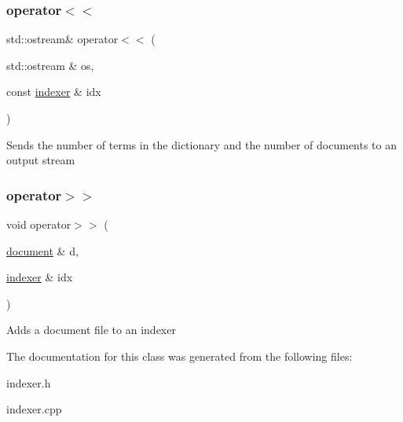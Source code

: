 \subsubsection{\texorpdfstring{operator$<$$<$}{operator<<}}
{\footnotesize\ttfamily std\+::ostream\& operator$<$$<$ (\begin{DoxyParamCaption}\item[{std\+::ostream \&}]{os,  }\item[{const \hyperlink{classindexer}{indexer} \&}]{idx }\end{DoxyParamCaption})\hspace{0.3cm}{\ttfamily [friend]}}

Sends the number of terms in the dictionary and the number of documents to an output stream \mbox{\label{classindexer_a0fe0af7a5ec91ffbe15a2a89d11fe038}} 
\subsubsection{\texorpdfstring{operator$>$$>$}{operator>>}}
{\footnotesize\ttfamily void operator$>$$>$ (\begin{DoxyParamCaption}\item[{\hyperlink{classdocument}{document} \&}]{d,  }\item[{\hyperlink{classindexer}{indexer} \&}]{idx }\end{DoxyParamCaption})\hspace{0.3cm}{\ttfamily [friend]}}

Adds a document file to an indexer 

The documentation for this class was generated from the following files\+:\begin{DoxyCompactItemize}
\item 
indexer.\+h\item 
indexer.\+cpp\end{DoxyCompactItemize}
